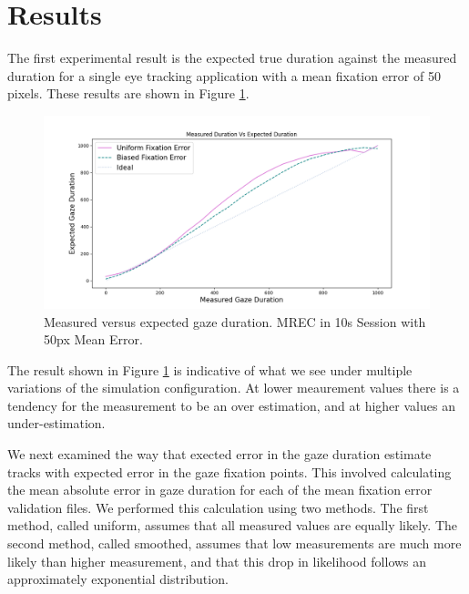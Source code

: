 \documentclass[12pt,a4paper]{article}
\numberwithin{equation}{section}
\begin{document}
\section{Results}

The first experimental result is the expected true duration against the measured duration
for a single eye tracking application with a mean fixation error of 50 pixels. These
results are shown in Figure \ref{fig:measured_vs_expected}.

\begin{figure}[h!]
\includegraphics[scale=0.5]{../results/Measured_vs_expected.png}
\caption{Measured versus expected gaze duration. MREC in 10s Session with 50px Mean Error.}
\label{fig:measured_vs_expected}
\end{figure}

The result shown in Figure \ref{fig:measured_vs_expected} is indicative of what we see under
multiple variations of the simulation configuration. At lower meaurement values there is a 
tendency for the measurement to be an over estimation, and at higher values an under-estimation.
 
We next examined the way that exected error in the gaze duration estimate tracks with expected 
error in the gaze fixation points. This involved calculating the mean absolute error in gaze
duration for each of the mean fixation error validation files. We performed this calculation
using two methods. The first method, called uniform, assumes that all measured values are 
equally likely. The second method, called smoothed, assumes that low measurements are much
more likely than higher measurement, and that this drop in likelihood follows an approximately
exponential distribution.
\end{document}

